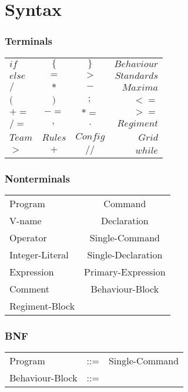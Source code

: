 \section{Syntax}
	\subsubsection{Terminals}
		
		\begin{tabular}{ l c c r}
			$if  	 $& $\{ 	 $&$ \} 	  $&$ Behaviour$  \\
		  	$else	 $&$ = 		 $&$ >  	  $&$ Standards$  \\
		 	$/ 		 $&$ *  	 $&$ -  	  $&$ Maxima$	  \\
		 	$( 		 $&$ )  	 $&$ ;  	  $&$ < =$		  \\
		 	$+= 	 $&$ -=   	 $&$ *= 	  $&$ > =$	    \\
		 	$/= 	 $&$ ,     	 $&$ .  	  $&$ Regiment$   \\
			$Team	 $&$ Rules   $&$ Config   $&$ Grid$	   \\
			$>		 $&$   + 	 $&$ //	 	  $&$ while $   \\
		\end{tabular}
	\subsubsection{Nonterminals}
		\begin{tabular}{l c}
			Program	 		& Command			  \\
			V-name	 		& Declaration		  \\
			Operator	    & Single-Command	  \\
			Integer-Literal	& Single-Declaration  \\
			Expression		& Primary-Expression  \\
			Comment			& Behaviour-Block	  \\
			Regiment-Block  &				   		\\
			
		\end{tabular}
	
	\subsubsection{BNF}
		\begin{tabular}{ l c c }
			Program	&	::=	&	Single-Command	\\
			Behaviour-Block	&	::=	 & \\
		\end{tabular}